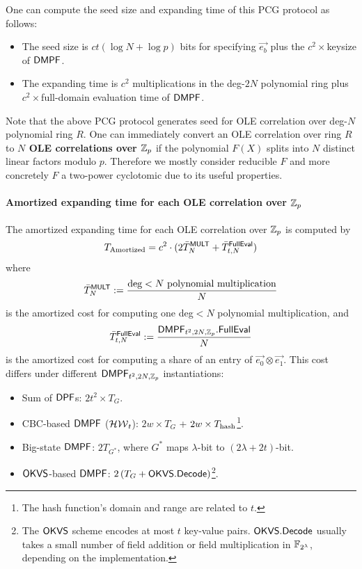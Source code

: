 One can compute the seed size and expanding time of this PCG protocol as follows: 
\begin{itemize}
    \item The seed size is $ct(\log N+\log p)$ bits for specifying $\vec{e_b}$ plus the $c^2\times $keysize of ${\sf DMPF}$. 
    \item The expanding time is $c^2$ multiplications in the deg-$2N$ polynomial ring  plus $c^2\times$full-domain evaluation time of ${\sf DMPF}$. 
\end{itemize}

\begin{remark}\label{rem:use_reducible_ring}
    Note that the above PCG protocol generates seed for OLE correlation over deg-$N$ polynomial ring $R$. One can immediately convert an OLE correlation over ring $R$ to \textbf{$N$ OLE correlations over $\mathbb{Z}_p$} if the polynomial $F(X)$ splits into $N$ distinct linear factors modulo $p$\cite{cryptoeprint:2022/1035}. Therefore we mostly consider reducible $F$ and more concretely $F$ a two-power cyclotomic due to its useful properties. 
\end{remark}

\paragraph{Amortized expanding time for each OLE correlation over $\mathbb{Z}_p$}The amortized expanding time for each OLE correlation over $\mathbb{Z}_p$ is computed by 
\[
  T_\text{Amortized} = c^2\cdot(2\bar{T}^{\sf MULT}_{N} + \bar{T}^{\sf FullEval}_{t,N})
\]
where 
\[
  \bar{T}^{\sf MULT}_{N} := \frac{\text{deg}<N\text{ polynomial multiplication}}{N}
\]
is the amortized cost for computing one deg$<N$ polynomial multiplication, and 
\[
  \bar{T}^{\sf FullEval}_{t,N}:=\frac{{\sf DMPF}_{t^2, 2N, \mathbb{Z}_p}.{\sf FullEval}}{N}
\]
is the amortized cost for computing a share of an entry of $\vec{e_0}\otimes\vec{e_1}$. This cost differs under different ${\sf DMPF}_{t^2, 2N, \mathbb{Z}_p}$ instantiations: 
\begin{itemize}
  \item Sum of ${\sf DPF}$s: $2t^2\times T_G$.
  \item CBC-based ${\sf DMPF}$ ($\mathcal{HW}_t$): $2w\times T_G$ + $2w\times T_{\rm hash}$\footnote{The hash function's domain and range are related to $t$. }.
  \item Big-state ${\sf DMPF}$: $2T_{G^*}$, where $G^*$ maps $\lambda$-bit to $(2\lambda+2t)$-bit. 
  \item ${\sf OKVS}$-based ${\sf DMPF}$: $2\left(T_G + {\sf OKVS}.{\sf Decode}\right)$\footnote{The ${\sf OKVS}$ scheme encodes at most $t$ key-value pairs. ${\sf OKVS}.{\sf Decode}$ usually takes a small number of field addition or field multiplication in $\mathbb{F}_{2^\lambda}$, depending on the implementation. }.
\end{itemize}



